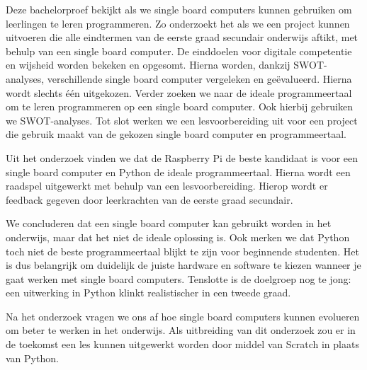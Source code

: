Deze bachelorproef bekijkt als we single board computers kunnen gebruiken om leerlingen te leren programmeren. Zo onderzoekt het als we een project kunnen uitvoeren die alle eindtermen van de eerste graad secundair onderwijs aftikt, met behulp van een single board computer. De einddoelen voor digitale competentie en wijsheid worden bekeken en opgesomt. Hierna worden, dankzij SWOT-analyses, verschillende single board computer vergeleken en geëvalueerd. Hierna wordt slechts één uitgekozen. Verder zoeken we naar de ideale programmeertaal om te leren programmeren op een single board computer. Ook hierbij gebruiken we SWOT-analyses. Tot slot werken we een lesvoorbereiding uit voor een project die gebruik maakt van de gekozen single board computer en programmeertaal.

Uit het onderzoek vinden we dat de Raspberry Pi de beste kandidaat is voor een single board computer en Python de ideale programmeertaal. Hierna wordt een raadspel uitgewerkt met behulp van een lesvoorbereiding. Hierop wordt er feedback gegeven door leerkrachten van de eerste graad secundair.

We concluderen dat een single board computer kan gebruikt worden in het onderwijs, maar dat het niet de ideale oplossing is. Ook merken we dat Python toch niet de beste programmeertaal blijkt te zijn voor beginnende studenten. Het is dus belangrijk om duidelijk de juiste hardware en software te kiezen wanneer je gaat werken met single board computers. Tenslotte is de doelgroep nog te jong: een uitwerking in Python klinkt realistischer in een tweede graad.

Na het onderzoek vragen we ons af hoe single board computers kunnen evolueren om beter te werken in het onderwijs. Als uitbreiding van dit onderzoek zou er in de toekomst een les kunnen uitgewerkt worden door middel van Scratch in plaats van Python.
